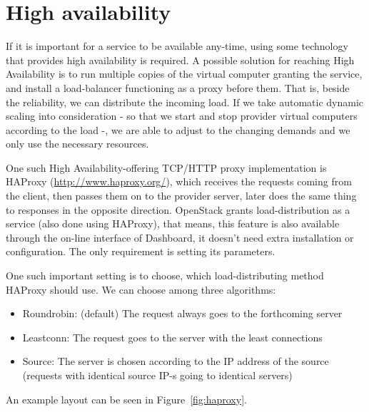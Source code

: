 \documentclass[a4paper]{article}
\begin{document}
\section{High availability}

If it is important for a service to be available any-time, using some technology that provides high availability is required. A possible solution for reaching High Availability is to run multiple copies of the virtual computer granting the service, and install a load-balancer functioning as a proxy before them. That is, beside the reliability, we can distribute the incoming load. If we take automatic dynamic scaling into consideration - so that we start and stop provider virtual computers according to the load -, we are able to adjust to the changing demands and we only use the necessary resources. 

One such High Availability-offering TCP/HTTP proxy implementation is HAProxy (\url{http://www.haproxy.org/}), which receives the requests coming from the client, then passes them on to the provider server, later does the same thing to responses in the opposite direction. OpenStack grants load-distribution as a service (also done using HAProxy), that means, this feature is also available through the on-line interface of Dashboard, it doesn't need extra installation or configuration. The only requirement is setting its parameters.

One such important setting is to choose, which load-distributing method HAProxy should use. We can choose among three algorithms:
\begin{itemize}
\item Roundrobin: (default) The request always goes to the forthcoming server
\item Leastconn: The request goes to the server with the least connections
\item Source: The server is chosen according to the IP address of the source (requests with identical source IP-s going to identical servers)
\end{itemize}
An example layout can be seen in Figure~\ref{fig:haproxy}.
\end{document}
